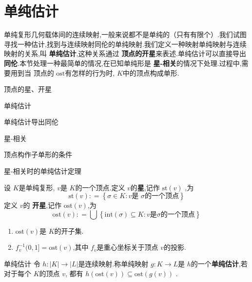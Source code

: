 \documentclass[../../几何与拓扑.tex]{subfiles}
\begin{document}
\section{单纯估计}

单纯复形几何载体间的连续映射,一般来说都不是单纯的（只有有限个）.我们试图寻找一种估计,找到与连续映射同伦的单纯映射.我们定义一种映射单纯映射与连续映射的关系,叫 \textbf{单纯估计},这种关系通过
\textbf{顶点的开星}来表述.单纯估计可以直接导出\textbf{同伦}.本节处理一种最简单的情况,在已知单纯形是 \textbf{星-相关}的情况下处理.过程中,需要用到当 顶点的 \(  \mathrm{ost}  \)有怎样的行为时,   \(  K  \)中的顶点构成单形.


\begin{introduction}
    \item 顶点的星、开星
    \item 单纯估计
    \item 单纯估计导出同伦
    \item 星-相关
    \item 顶点构作子单形的条件
    \item 星-相关时的单纯估计定理
\end{introduction}


\begin{definition}
    设 \(  K  \)是单纯复形, \(  v  \)是 \(  K  \)的一个顶点.定义 \(  v  \)的\textbf{星},记作 \(  \mathrm{st}\left( v \right)   \)     ,为 \[
    \mathrm{st}\left( v \right): =  \left\{  \sigma  \in K: v \text{是 }\sigma \text{的一个顶点} \right\} 
    \]定义 \(  v  \)的 \textbf{开星},记作 \(  \mathrm{ost}\left( v \right)   \),为 \[
    \mathrm{ost}\left( v \right): =  \bigcup \left\{  \mathrm{int}\left(  \sigma  \right)\subseteq K:  v\text{是} \sigma \text{的一个顶点}  \right\}
    \]  
\end{definition}

\begin{remark}
    \begin{enumerate}
        \item \( \mathrm{ost}\left( v \right)   \)是 \(  K  \)的开子集.  
        \item  \(  f_{v}^{-1} (0,1] =  \mathrm{ost}\left( v \right)   \),其中 \(  f_{v}  \)是重心坐标关于顶点 \(  v  \)的投影. 
    \end{enumerate}
    
\end{remark}

\begin{definition}{单纯估计}
    令 \(  h: \left| K \right| \to \left| L \right|    \)是连续映射.称单纯映射 \(  g: K\to L  \)是 \(  h  \)的一个\textbf{单纯估计},若对于每个 \(  K  \)的顶点 \(  v  \),
    都有 \(  h\left( \mathrm{ost}\left( v \right)  \right)\subseteq  \mathrm{ost}\left( g\left( v \right)  \right)    \)      .
\end{definition}
\end{document}
